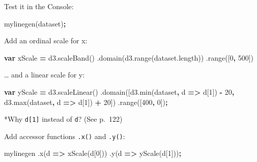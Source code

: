 \documentclass[openany]{book}
\newenvironment{Shaded}{\begin{snugshade}}{\end{snugshade}}
\newcommand{\AttributeTok}[1]{\textcolor[rgb]{0.77,0.63,0.00}{#1}}
\newcommand{\DecValTok}[1]{\textcolor[rgb]{0.00,0.00,0.81}{#1}}
\newcommand{\KeywordTok}[1]{\textcolor[rgb]{0.13,0.29,0.53}{\textbf{#1}}}
\newcommand{\NormalTok}[1]{#1}
\newcommand{\OperatorTok}[1]{\textcolor[rgb]{0.81,0.36,0.00}{\textbf{#1}}}
\newcommand{\VariableTok}[1]{\textcolor[rgb]{0.00,0.00,0.00}{#1}}
\begin{document}
Test it in the Console:

\begin{Shaded}
\begin{Highlighting}[]
\AttributeTok{mylinegen}\NormalTok{(dataset)}\OperatorTok{;}
\end{Highlighting}
\end{Shaded}

Add an ordinal scale for x:

\begin{Shaded}
\begin{Highlighting}[]
\KeywordTok{var}\NormalTok{ xScale }\OperatorTok{=} \VariableTok{d3}\NormalTok{.}\AttributeTok{scaleBand}\NormalTok{()}
\NormalTok{    .}\AttributeTok{domain}\NormalTok{(}\VariableTok{d3}\NormalTok{.}\AttributeTok{range}\NormalTok{(}\VariableTok{dataset}\NormalTok{.}\AttributeTok{length}\NormalTok{))}
\NormalTok{    .}\AttributeTok{range}\NormalTok{([}\DecValTok{0}\OperatorTok{,} \DecValTok{500}\NormalTok{])}
\end{Highlighting}
\end{Shaded}

\ldots{} and a linear scale for y:

\begin{Shaded}
\begin{Highlighting}[]
\KeywordTok{var}\NormalTok{ yScale }\OperatorTok{=} \VariableTok{d3}\NormalTok{.}\AttributeTok{scaleLinear}\NormalTok{()}
\NormalTok{    .}\AttributeTok{domain}\NormalTok{([}\VariableTok{d3}\NormalTok{.}\AttributeTok{min}\NormalTok{(dataset}\OperatorTok{,}\NormalTok{ d }\OperatorTok{=>}\NormalTok{ d[}\DecValTok{1}\NormalTok{]) }\OperatorTok{-} \DecValTok{20}\OperatorTok{,}
             \VariableTok{d3}\NormalTok{.}\AttributeTok{max}\NormalTok{(dataset}\OperatorTok{,}\NormalTok{ d }\OperatorTok{=>}\NormalTok{ d[}\DecValTok{1}\NormalTok{]) }\OperatorTok{+} \DecValTok{20}\NormalTok{])}
\NormalTok{    .}\AttributeTok{range}\NormalTok{([}\DecValTok{400}\OperatorTok{,} \DecValTok{0}\NormalTok{])}\OperatorTok{;}         
\end{Highlighting}
\end{Shaded}

*Why \texttt{d{[}1{]}} instead of \texttt{d}? (See p.~122)

Add accessor functions \texttt{.x()} and \texttt{.y()}:

\begin{Shaded}
\begin{Highlighting}[]
\NormalTok{mylinegen}
\NormalTok{    .}\AttributeTok{x}\NormalTok{(d }\OperatorTok{=>} \AttributeTok{xScale}\NormalTok{(d[}\DecValTok{0}\NormalTok{]))}
\NormalTok{    .}\AttributeTok{y}\NormalTok{(d }\OperatorTok{=>} \AttributeTok{yScale}\NormalTok{(d[}\DecValTok{1}\NormalTok{]))}\OperatorTok{;}
\end{Highlighting}
\end{Shaded}
\end{document}

